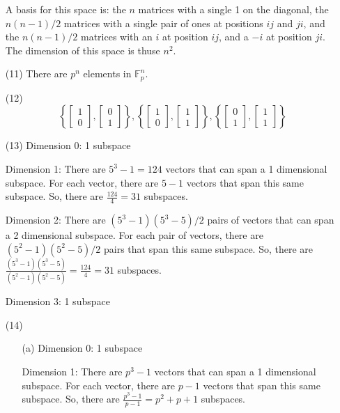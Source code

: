 \documentclass[12pt]{article}
\begin{document}
\begin{itemize}
A basis for this space is: the $n$ matrices with a single 1 on the diagonal, the $n(n - 1)/2$ matrices with a single pair of ones at positions $ij$ and $ji$, and the $n(n - 1)/2$ matrices with an $i$ at position $ij$, and a $-i$ at position $ji$. The dimension of this space is thuse $n^2$.
\item[(11)]
There are $p^n$ elements in $\mathbb{F}_p^n$.
\item[(12)]
$$\left\lbrace \begin{bmatrix}
1 \\
0
\end{bmatrix}, \begin{bmatrix}
0 \\
1
\end{bmatrix} \right\rbrace, \left\lbrace \begin{bmatrix}
1 \\
0
\end{bmatrix}, \begin{bmatrix}
1 \\
1
\end{bmatrix} \right\rbrace, \left\lbrace
\begin{bmatrix}
0 \\
1
\end{bmatrix}, \begin{bmatrix}
1 \\
1
\end{bmatrix} \right\rbrace$$
\item[(13)]
Dimension 0: 1 subspace

Dimension 1: There are $5^3 - 1 = 124$ vectors that can span a 1 dimensional subspace. For each vector, there are $5 - 1$ vectors that span this same subspace. So, there are $\frac{124}{4} = 31$ subspaces.

Dimension 2: There are $(5^3 - 1)(5^3 - 5)/2$ pairs of vectors that can span a 2 dimensional subspace. For each pair of vectors, there are $(5^2 - 1)(5^2 - 5)/2$ pairs that span this same subspace. So, there are $\frac{(5^3 - 1)(5^3 - 5)}{(5^2 - 1)(5^2 - 5)} = \frac{124}{4} = 31$ subspaces.

Dimension 3: 1 subspace
\item[(14)]
\begin{itemize}
\item[(a)]
Dimension 0: 1 subspace

Dimension 1: There are $p^3 - 1$ vectors that can span a 1 dimensional subspace. For each vector, there are $p - 1$ vectors that span this same subspace. So, there are $\frac{p^3 - 1}{p - 1} = p^2 + p + 1$ subspaces.


\end{itemize}
\end{itemize}
\end{document}
